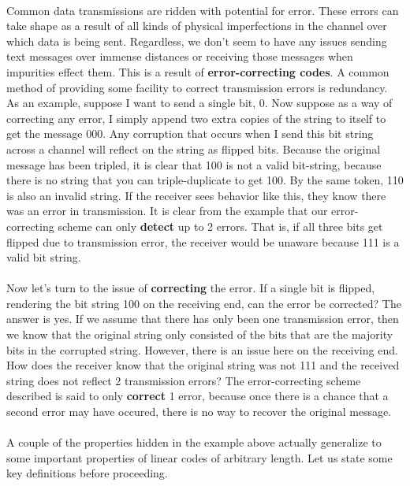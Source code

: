\documentclass{article}
\theoremstyle{definition}
\begin{document}
\paragraph{} Common data transmissions are ridden with potential for error.  These errors can take shape as a result of all kinds of physical imperfections in the channel over which data is being sent.  Regardless, we don't seem to have any issues sending text messages over immense distances or receiving those messages when impurities effect them.  This is a result of \textbf{error-correcting codes}.  A common method of providing some facility to correct transmission errors is redundancy.  As an example, suppose I want to send a single bit, 0.  Now suppose as a way of correcting any error, I simply append two extra copies of the string to itself to get the message 000.  Any corruption that occurs when I send this bit string across a channel will reflect on the string as flipped bits.  Because the original message has been tripled, it is clear that 100 is not a valid bit-string, because there is no string that you can triple-duplicate to get 100.  By the same token, 110 is also an invalid string.  If the receiver sees behavior like this, they know there was an error in transmission.  It is clear from the example that our error-correcting scheme can only \textbf{detect} up to 2 errors.  That is, if all three bits get flipped due to transmission error, the receiver would be unaware because 111 is a valid bit string.  \\
\paragraph{} Now let's turn to the issue of \textbf{correcting} the error.  If a single bit is flipped, rendering the bit string 100 on the receiving end, can the error be corrected?  The answer is yes.  If we assume that there has only been one transmission error, then we know that the original string only consisted of the bits that are the majority bits in the corrupted string.  However, there is an issue here on the receiving end.  How does the receiver know that the original string was not 111 and the received string does not reflect 2 transmission errors?  The error-correcting scheme described is said to only \textbf{correct} 1 error, because once there is a chance that a second error may have occured, there is no way to recover the original message. 
\paragraph{} A couple of the properties hidden in the example above actually generalize to some important properties of linear codes of arbitrary length.  Let us state some key definitions before proceeding.        
\end{document}
